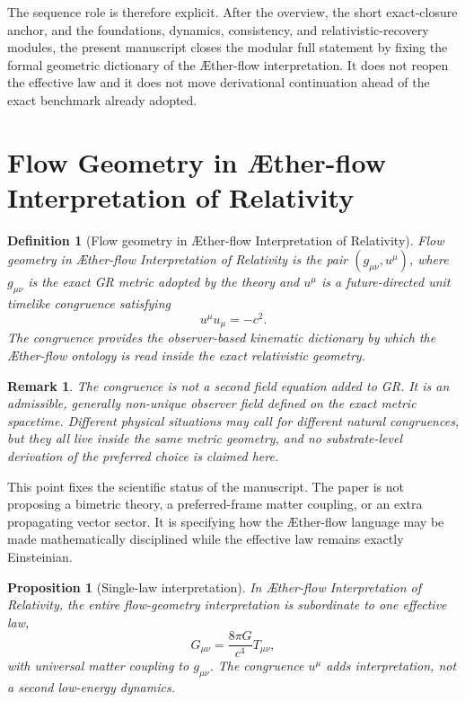 \documentclass[11pt]{article}
\newcommand{\Aflow}{\AE{}ther-flow}
\newcommand{\TheoryName}{\Aflow{} Interpretation of Relativity}
\newtheorem{definition}{Definition}
\newtheorem{proposition}{Proposition}
\newtheorem{remark}{Remark}
\begin{document}
The sequence role is therefore explicit. After the overview, the short exact-closure anchor, and the foundations, dynamics, consistency, and relativistic-recovery modules, the present manuscript closes the modular full statement by fixing the formal geometric dictionary of the \Aflow{} interpretation. It does not reopen the effective law and it does not move derivational continuation ahead of the exact benchmark already adopted.

\section{Flow Geometry in \TheoryName{}}

\begin{definition}[Flow geometry in \TheoryName{}]
Flow geometry in \TheoryName{} is the pair \((g_{\mu\nu},u^\mu)\), where \(g_{\mu\nu}\) is the exact GR metric adopted by the theory and \(u^\mu\) is a future-directed unit timelike congruence satisfying
\begin{equation}
u^\mu u_\mu = -c^2.
\label{eq:unitnorm}
\end{equation}
The congruence provides the observer-based kinematic dictionary by which the \Aflow{} ontology is read inside the exact relativistic geometry.
\end{definition}

\begin{remark}
The congruence is not a second field equation added to GR. It is an admissible, generally non-unique observer field defined on the exact metric spacetime. Different physical situations may call for different natural congruences, but they all live inside the same metric geometry, and no substrate-level derivation of the preferred choice is claimed here.
\end{remark}

This point fixes the scientific status of the manuscript. The paper is not proposing a bimetric theory, a preferred-frame matter coupling, or an extra propagating vector sector. It is specifying how the \Aflow{} language may be made mathematically disciplined while the effective law remains exactly Einsteinian.

\begin{proposition}[Single-law interpretation]
In \TheoryName{}, the entire flow-geometry interpretation is subordinate to one effective law,
\begin{equation}
G_{\mu\nu}=\frac{8\pi G}{c^4}T_{\mu\nu},
\label{eq:einstein}
\end{equation}
with universal matter coupling to \(g_{\mu\nu}\). The congruence \(u^\mu\) adds interpretation, not a second low-energy dynamics.
\end{proposition}
\end{document}
